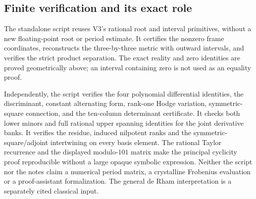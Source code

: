 \documentclass[11pt]{article}
\theoremstyle{definition}
\theoremstyle{remark}
\begin{document}
\subsection{Finite verification and its exact role}
The standalone script
 reuses V3's
rational root and interval primitives, without a new floating-point root or
period estimate. It certifies the nonzero frame coordinates, reconstructs the
three-by-three metric with outward intervals, and verifies the strict product
separation. The exact reality and zero identities are proved geometrically
above; an interval containing zero is not used as an equality proof.

Independently, the script verifies the four polynomial differential identities,
the discriminant, constant alternating form, rank-one Hodge variation,
symmetric-square connection, and the ten-column determinant certificate. It
checks both lower minors and full rational upper spanning identities for the
joint derivative banks. It verifies the residue, induced nilpotent ranks and
the symmetric-square/adjoint intertwining on every basis element. The
rational Taylor recurrence and the displayed modulo-$101$ matrix make the
principal cyclicity proof reproducible without a large opaque symbolic
expression. Neither the script nor the notes claim a numerical period
matrix, a crystalline Frobenius evaluation or a proof-assistant
formalization. The general de Rham interpretation is a separately cited
classical input.
\end{document}
